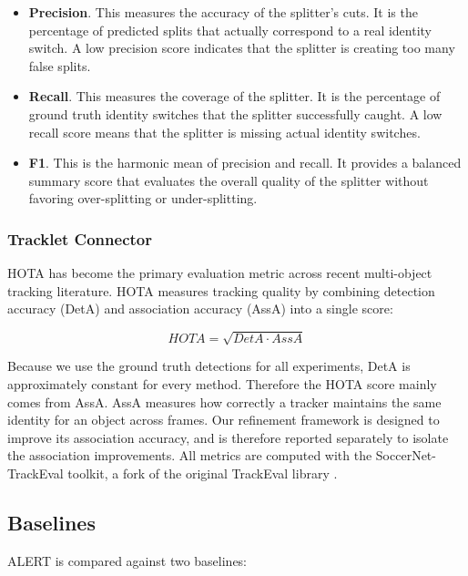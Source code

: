 \begin{itemize}
    \item \textbf{Precision}. This measures the accuracy of the splitter's cuts. It is the percentage of predicted splits that actually correspond to a real identity switch. A low precision score indicates that the splitter is creating too many false splits.

    \item \textbf{Recall}. This measures the coverage of the splitter. It is the percentage of ground truth identity switches that the splitter successfully caught. A low recall score means that the splitter is missing actual identity switches.

    \item \textbf{F1}. This is the harmonic mean of precision and recall. It provides a balanced summary score that evaluates the overall quality of the splitter without favoring over-splitting or under-splitting.
\end{itemize}


\subsubsection{Tracklet Connector}

HOTA \cite{hota} has become the primary evaluation metric across recent multi-object tracking literature. HOTA measures tracking quality by combining detection accuracy (DetA) and association accuracy (AssA) into a single score:

\begin{equation}
    HOTA = \sqrt{DetA \cdot AssA}
\end{equation}

Because we use the ground truth detections for all experiments, DetA is approximately constant for every method. Therefore the HOTA score mainly comes from AssA. AssA measures how correctly a tracker maintains the same identity for an object across frames. Our refinement framework is designed to improve its association accuracy, and is therefore reported separately to isolate the association improvements. All metrics are computed with the SoccerNet-TrackEval toolkit, a fork of the original TrackEval library \cite{trackeval}. 

\subsection{Baselines}\label{sec:baselines}
ALERT is compared against two baselines:

